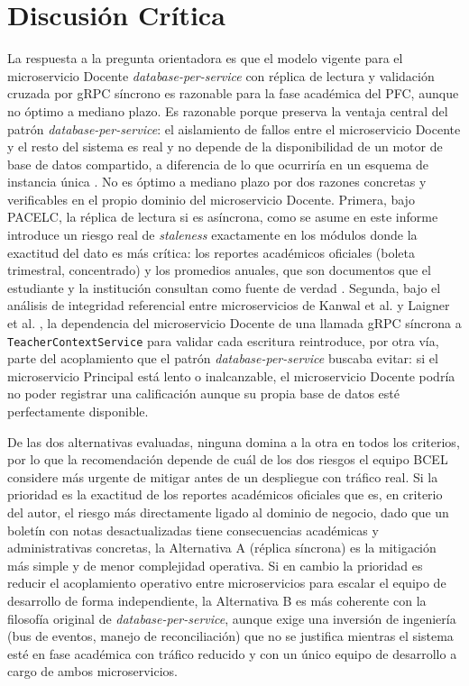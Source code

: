 \documentclass[11pt,a4paper]{article}
\begin{document}
\section{Discusión Crítica}

La respuesta a la pregunta orientadora es que el modelo vigente para el microservicio Docente \emph{database-per-service} con réplica de lectura y validación cruzada por gRPC síncrono es razonable para la fase académica del PFC, aunque no óptimo a mediano plazo. Es razonable porque preserva la ventaja central del patrón \emph{database-per-service}: el aislamiento de fallos entre el microservicio Docente y el resto del sistema es real y no depende de la disponibilidad de un motor de base de datos compartido, a diferencia de lo que ocurriría en un esquema de instancia única \cite{laigner2021}. No es óptimo a mediano plazo por dos razones concretas y verificables en el propio dominio del microservicio Docente. Primera, bajo PACELC, la réplica de lectura si es asíncrona, como se asume en este informe introduce un riesgo real de
\emph{staleness} exactamente en los módulos donde la exactitud del dato es más crítica: los reportes académicos oficiales (boleta trimestral, concentrado) y los promedios anuales, que son documentos que el estudiante y la institución consultan como fuente de verdad \cite{abadi2012}. Segunda, bajo el análisis de integridad referencial entre microservicios de Kanwal et al. \cite{kanwal2025} y Laigner et al. \cite{laigner2021}, la dependencia del microservicio Docente de una llamada gRPC síncrona a \texttt{TeacherContextService} para validar cada escritura reintroduce, por otra vía, parte del acoplamiento que el patrón
\emph{database-per-service} buscaba evitar: si el microservicio Principal está lento o inalcanzable, el microservicio Docente podría no poder registrar una calificación aunque su propia base de datos esté perfectamente disponible.

De las dos alternativas evaluadas, ninguna domina a la otra en todos los criterios, por lo que la recomendación depende de cuál de los dos riesgos el equipo BCEL considere más urgente de mitigar antes de un despliegue con tráfico real. Si la prioridad es la exactitud de los reportes académicos oficiales que es, en criterio del autor, el riesgo más directamente ligado al dominio de negocio, dado que un boletín con notas desactualizadas tiene consecuencias
académicas y administrativas concretas, la Alternativa A (réplica síncrona) es la mitigación más simple y de menor complejidad operativa. Si en cambio la prioridad es reducir el acoplamiento operativo entre microservicios para escalar el equipo de desarrollo de forma independiente, la Alternativa B es más coherente con la filosofía original de \emph{database-per-service}, aunque exige una inversión de ingeniería (bus de eventos, manejo de reconciliación) que no se justifica mientras el sistema esté en fase académica con tráfico reducido y con un único equipo de desarrollo a cargo de ambos microservicios.
\end{document}
